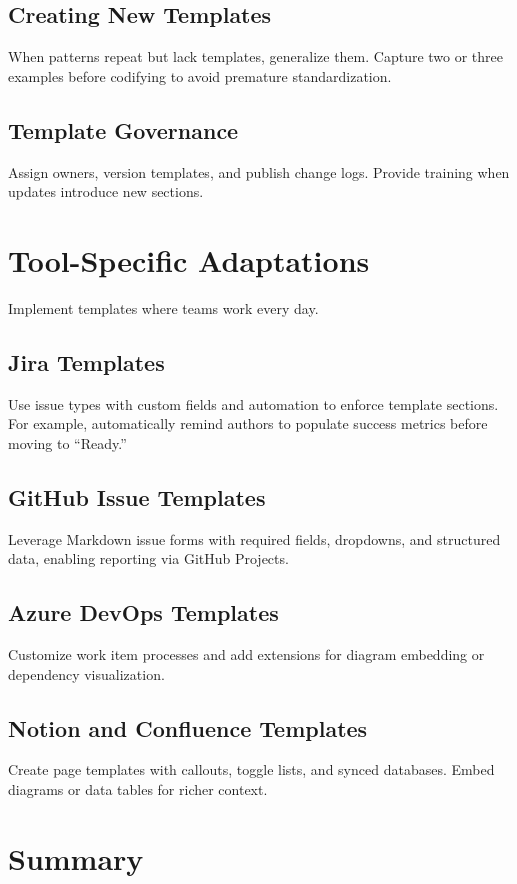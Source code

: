 \subsection{Creating New Templates}
When patterns repeat but lack templates, generalize them. Capture two or three examples before codifying to avoid premature standardization.

\subsection{Template Governance}
Assign owners, version templates, and publish change logs. Provide training when updates introduce new sections.

\section{Tool-Specific Adaptations}
\label{sec:tool-adaptations}

Implement templates where teams work every day.

\subsection{Jira Templates}
Use issue types with custom fields and automation to enforce template sections. For example, automatically remind authors to populate success metrics before moving to ``Ready.''

\subsection{GitHub Issue Templates}
Leverage Markdown issue forms with required fields, dropdowns, and structured data, enabling reporting via GitHub Projects.

\subsection{Azure DevOps Templates}
Customize work item processes and add extensions for diagram embedding or dependency visualization.

\subsection{Notion and Confluence Templates}
Create page templates with callouts, toggle lists, and synced databases. Embed diagrams or data tables for richer context.

\section{Summary}
\label{sec:templates-summary}

